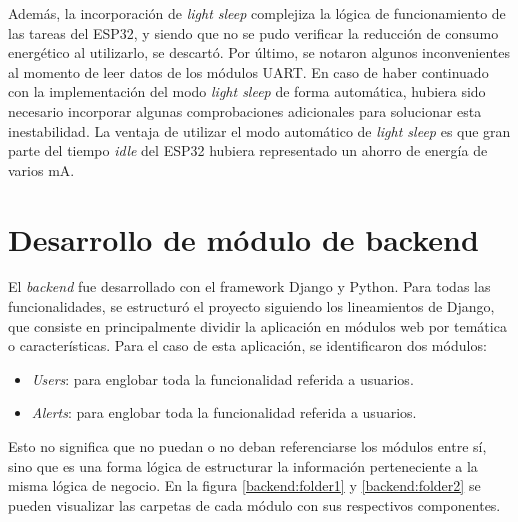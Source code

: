 {Además, la incorporación de \textit{light sleep} complejiza la lógica de funcionamiento de las tareas del ESP32, y siendo que no se pudo verificar la reducción de consumo energético al utilizarlo, se descartó. Por último, se notaron algunos inconvenientes al momento de leer datos de los módulos UART. En caso de haber continuado con la implementación del modo \textit{light sleep} de forma automática, hubiera sido necesario incorporar algunas comprobaciones adicionales para solucionar esta inestabilidad. La ventaja de utilizar el modo automático de \textit{light sleep} es que gran parte del tiempo \textit{idle} del ESP32 hubiera representado un ahorro de energía de varios mA.

\section{Desarrollo de módulo de backend}

El \textit{backend} fue desarrollado con el framework Django y Python. Para todas las funcionalidades, se estructuró el proyecto siguiendo los lineamientos de Django, que consiste en principalmente dividir la aplicación en módulos web por temática o características. Para el caso de esta aplicación, se identificaron dos módulos:
\begin{itemize}
	\item \textit{Users}: para englobar toda la funcionalidad referida a usuarios.
	\item \textit{Alerts}: para englobar toda la funcionalidad referida a usuarios.
\end{itemize}

Esto no significa que no puedan o no deban referenciarse los módulos entre sí, sino que es una forma lógica de estructurar la información perteneciente a la misma lógica de negocio. En la figura \ref{backend:folder1} y \ref{backend:folder2} se pueden visualizar las carpetas de cada módulo con sus respectivos componentes.

}
